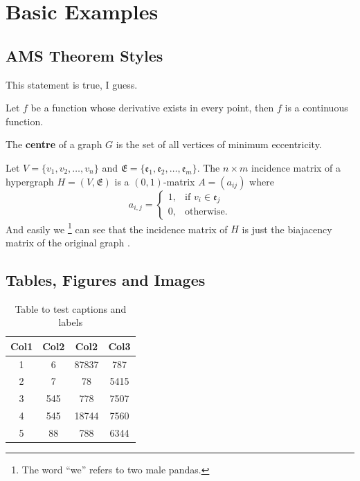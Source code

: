 \chapter{Basic Examples}
\label{ch:ch1}

\section{AMS Theorem Styles}

\begin{remark}
	This statement is true, I guess.
\end{remark}

\begin{theorem}
	Let \(f\) be a function whose derivative exists in every point, then \(f\) is a continuous function.
\end{theorem}

\begin{definition}
	The \textbf{centre} of a graph \(G\) is the set of all vertices of minimum eccentricity.
\end{definition}

Let \(V = \{v_1, v_2, \dotsc, v_n\}\) and \(\mathfrak{E} = \{\mathfrak{e}_1, \mathfrak{e}_2, \dotsc, \mathfrak{e}_m\}\). The \(n \times m\) incidence matrix of a hypergraph \(H = (V, \mathfrak{E})\) is a \((0, 1)\)-matrix \(A = (a_{ij})\) where
\begin{equation*}
	a_{i, j} =
	\begin{cases}
		1, & \text{if \(v_i \in \mathfrak{e}_j\)} \\
		0, & \text{otherwise.}
	\end{cases}
\end{equation*}
And easily we \footnote{The word ``we'' refers to two male pandas.} can see that the incidence matrix of \(H\) is just the biajacency matrix of the original graph \cite[pp.~22]{tanenbaum2011computer}.

\section{Tables, Figures and Images}

\lipsum[1]

\begin{table}[ht]
	\centering
	\begin{tabular}{||c c c c||}
		\hline
		Col1 & Col2 & Col2 & Col3 \\ [0.5ex]
		\hline\hline
		1 & 6 & 87837 \tablefootnote{This is a footnote in the table.} & 787 \\
		2 & 7 & 78 & 5415 \\
		3 & 545 & 778 & 7507 \\
		4 & 545 & 18744 & 7560 \\
		5 & 88 & 788 & 6344 \\ [1ex]
		\hline
	\end{tabular}
	\caption{Table to test captions and labels}
\end{table}

